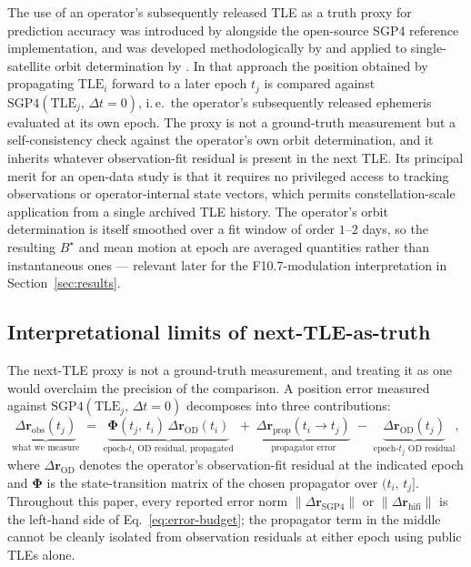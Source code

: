 \documentclass[10pt, letterpaper]{article}
\begin{document}
The use of an operator's subsequently released TLE as a truth proxy
for prediction accuracy was introduced by \citet{vallado2006} alongside
the open-source SGP4 reference implementation, and was developed
methodologically by \citet{vallado2012} and applied to single-satellite
orbit determination by \citet{vallado_crawford2008}. In that approach
the position obtained by propagating $\mathrm{TLE}_{i}$ forward to a
later epoch $t_{j}$ is compared against
$\mathrm{SGP4}(\mathrm{TLE}_{j},\,\Delta t = 0)$, i.\,e.\ the operator's
subsequently released ephemeris evaluated at its own epoch. The proxy
is not a ground-truth measurement but a self-consistency check against
the operator's own orbit determination, and it inherits whatever
observation-fit residual is present in the next TLE. Its principal
merit for an open-data study is that it requires no privileged access
to tracking observations or operator-internal state vectors, which
permits constellation-scale application from a single archived TLE
history. The operator's orbit determination is itself smoothed over
a fit window of order $1$--$2$ days, so the resulting $B^{\!\star}$
and mean motion at epoch are averaged quantities rather than
instantaneous ones --- relevant later for the
F10.7-modulation interpretation in Section~\ref{sec:results}.

\subsection{Interpretational limits of next-TLE-as-truth}
\label{sec:background-truth-floor}

The next-TLE proxy is not a ground-truth measurement, and treating
it as one would overclaim the precision of the comparison. A
position error measured against $\mathrm{SGP4}(\mathrm{TLE}_{j},\,
\Delta t = 0)$ decomposes into three contributions:
\begin{equation}
  \label{eq:error-budget}
  \underbrace{\Delta\mathbf{r}_{\mathrm{obs}}(t_{j})}_{\text{what we measure}}
  \;=\;
  \underbrace{\boldsymbol{\Phi}(t_{j},\,t_{i})\,\Delta\mathbf{r}_{\mathrm{OD}}(t_{i})}_{\text{epoch-}t_{i}\text{ OD residual, propagated}}
  \;+\;
  \underbrace{\Delta\mathbf{r}_{\mathrm{prop}}(t_{i}\!\to\!t_{j})}_{\text{propagator error}}
  \;-\;
  \underbrace{\Delta\mathbf{r}_{\mathrm{OD}}(t_{j})}_{\text{epoch-}t_{j}\text{ OD residual}},
\end{equation}
where $\Delta\mathbf{r}_{\mathrm{OD}}$ denotes the operator's
observation-fit residual at the indicated epoch and $\boldsymbol{
\Phi}$ is the state-transition matrix of the chosen propagator over
$(t_{i},\,t_{j}]$. Throughout this paper, every reported error norm
$\lVert\Delta\mathbf{r}_{\mathrm{SGP4}}\rVert$ or
$\lVert\Delta\mathbf{r}_{\mathrm{hifi}}\rVert$ is the left-hand side
of Eq.~\eqref{eq:error-budget}; the propagator term in the middle
cannot be cleanly isolated from observation residuals at either
epoch using public TLEs alone.
\end{document}
